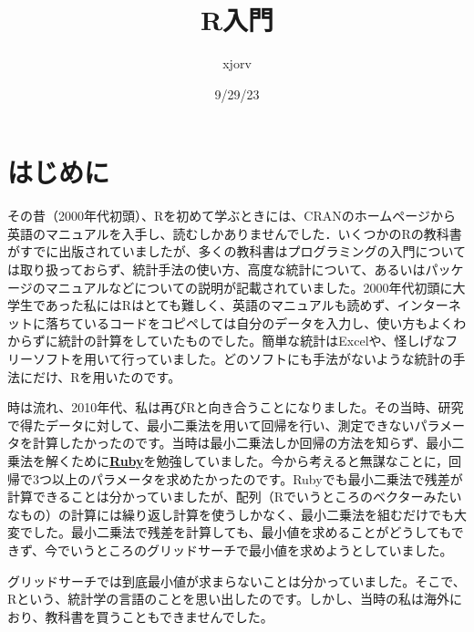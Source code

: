 \documentclass[
  letterpaper,
  DIV=11,
  numbers=noendperiod]{scrreprt}
\title{R入門}
\author{xjorv}
\date{9/29/23}
\renewcommand*\contentsname{Table of contents}
\newcommand\contentsname{Table of contents}
\begin{document}
\maketitle
\ifdefined\Shaded\renewenvironment{Shaded}{\begin{tcolorbox}[sharp corners, boxrule=0pt, frame hidden, borderline west={3pt}{0pt}{shadecolor}, interior hidden, enhanced, breakable]}{\end{tcolorbox}}\fi

\renewcommand*\contentsname{Table of contents}
{
\hypersetup{linkcolor=}
\setcounter{tocdepth}{2}
\tableofcontents
}

\hypertarget{ux306fux3058ux3081ux306b}{%
\chapter*{はじめに}\label{ux306fux3058ux3081ux306b}}


その昔（2000年代初頭）、Rを初めて学ぶときには、CRANのホームページから英語のマニュアルを入手し、読むしかありませんでした．いくつかのRの教科書がすでに出版されていましたが、多くの教科書はプログラミングの入門については取り扱っておらず、統計手法の使い方、高度な統計について、あるいはパッケージのマニュアルなどについての説明が記載されていました。2000年代初頭に大学生であった私にはRはとても難しく、英語のマニュアルも読めず、インターネットに落ちているコードをコピペしては自分のデータを入力し、使い方もよくわからずに統計の計算をしていたものでした。簡単な統計はExcelや、怪しげなフリーソフトを用いて行っていました。どのソフトにも手法がないような統計の手法にだけ、Rを用いたのです。

時は流れ、2010年代、私は再びRと向き合うことになりました。その当時、研究で得たデータに対して、最小二乗法を用いて回帰を行い、測定できないパラメータを計算したかったのです。当時は最小二乗法しか回帰の方法を知らず、最小二乗法を解くために\textbf{\href{https://www.ruby-lang.org/ja/}{Ruby}}を勉強していました。今から考えると無謀なことに，回帰で3つ以上のパラメータを求めたかったのです。Rubyでも最小二乗法で残差が計算できることは分かっていましたが、配列（Rでいうところのベクターみたいなもの）の計算には繰り返し計算を使うしかなく、最小二乗法を組むだけでも大変でした。最小二乗法で残差を計算しても、最小値を求めることがどうしてもできず、今でいうところのグリッドサーチで最小値を求めようとしていました。

グリッドサーチでは到底最小値が求まらないことは分かっていました。そこで、Rという、統計学の言語のことを思い出したのです。しかし、当時の私は海外におり、教科書を買うこともできませんでした。
\end{document}
